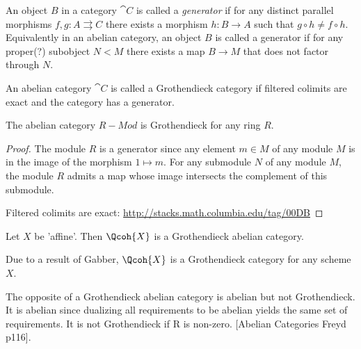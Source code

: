 
\begin{definition}
An object $B$ in a category $\cat{C}$ is called a \emph{generator} if for any distinct parallel morphisms 
$f,g:A\rightrightarrows C$ there exists a morphism $h:B\rightarrow A$ such that $g\circ h\neq f\circ h$.
Equivalently in an abelian category, an object $B$ is called a generator if for any proper(?) subobject $N<M$ there exists a map $B\rightarrow M$ that does not factor through $N$.
\end{definition}

\begin{definition}
An abelian category $\cat{C}$ is called a Grothendieck category if filtered colimits are exact and the category has a generator.
\end{definition}

\begin{lemma}
The abelian category $R-Mod$ is Grothendieck for any ring $R$.
\end{lemma}
\begin{proof}
The module $R$ is a generator since any element $m\in M$ of any module $M$ is in the image of the morphism $1\mapsto m$.
For any submodule $N$ of any module $M$, the module $R$ admits a map whose image intersects the complement of this submodule.

Filtered colimits are exact: \url{http://stacks.math.columbia.edu/tag/00DB}
\end{proof}

\begin{corollary}

Let $X$ be 'affine'. Then $\Qcoh{X}$ is a Grothendieck abelian category.
\end{corollary}

\begin{remark}

Due to a result of Gabber, $\Qcoh{X}$ is a Grothendieck category for any scheme $X$.
\end{remark}

\begin{remark}
The opposite of a Grothendieck abelian category is abelian but not Grothendieck. 
It is abelian since dualizing all requirements to be abelian yields the same set of requirements. 
It is not Grothendieck if R is non-zero. [Abelian Categories Freyd p116].
\end{remark}

